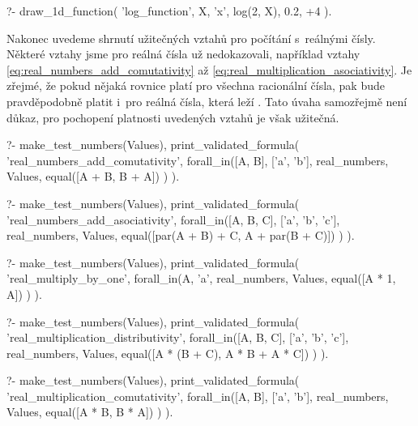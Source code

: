 \begin{prolog}
?-	draw_1d_function(
		'log_function',
		X,
		'x',
		log(2, X),
		0.2, +4
	).				
\end{prolog}

Nakonec uvedeme shrnutí užitečných vztahů pro počítání s~reálnými čísly. Některé vztahy jsme pro reálná čísla už nedokazovali, například vztahy \eqref{eq:real_numbers_add_comutativity} až \eqref{eq:real_multiplication_asociativity}. Je zřejmé, že pokud nějaká rovnice platí pro všechna racionální čísla, pak bude pravděpodobně platit i~pro reálná čísla, která leží . Tato úvaha samozřejmě není důkaz, pro pochopení platnosti uvedených vztahů je však užitečná.

\begin{fact}
\begin{prolog}
?-	make_test_numbers(Values),
	print_validated_formula(
		'real_numbers_add_comutativity',
		forall_in([A, B], ['a', 'b'], real_numbers, Values,
			equal([A + B, B + A])
		)
	).
\end{prolog}
\begin{prolog}
?-	make_test_numbers(Values),
	print_validated_formula(
		'real_numbers_add_asociativity',
		forall_in([A, B, C], ['a', 'b', 'c'], real_numbers, Values,
			equal([par(A + B) + C, A + par(B + C)])
		)
	).
\end{prolog}
\begin{prolog}
?-	make_test_numbers(Values),
	print_validated_formula(
		'real_multiply_by_one',
		forall_in(A, 'a', real_numbers, Values,
			equal([A * 1, A])
		)
	).				
\end{prolog}
\begin{prolog}
?-	make_test_numbers(Values),
	print_validated_formula(
		'real_multiplication_distributivity',
		forall_in([A, B, C], ['a', 'b', 'c'], real_numbers, Values,
			equal([A * (B + C), A * B + A * C])
		)
	).				
\end{prolog}
\begin{prolog}
?-	make_test_numbers(Values),
	print_validated_formula(
		'real_multiplication_comutativity',
		forall_in([A, B], ['a', 'b'], real_numbers, Values,
			equal([A * B, B * A])
		)
	).				
\end{prolog}

\end{fact}

